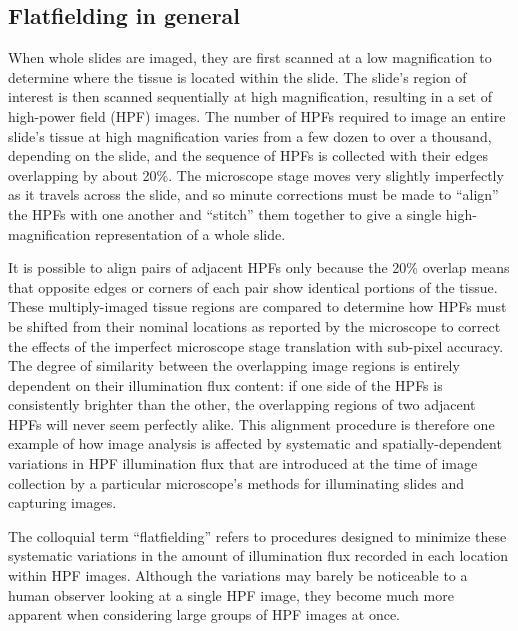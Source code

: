 \documentclass[letterpaper,11pt]{article}
\begin{document}
\subsection{Flatfielding in general}
\label{ssec:flatfielding_in_general}

When whole slides are imaged, they are first scanned at a low magnification to determine where the tissue is located within the slide. The slide's region of interest is then scanned sequentially at high magnification, resulting in a set of high-power field (HPF) images. The number of HPFs required to image an entire slide's tissue at high magnification varies from a few dozen to over a thousand, depending on the slide, and the sequence of HPFs is collected with their edges overlapping by about 20\%. The microscope stage moves very slightly imperfectly as it travels across the slide, and so minute corrections must be made to ``align'' the HPFs with one another and ``stitch'' them together to give a single high-magnification representation of a whole slide.

It is possible to align pairs of adjacent HPFs only because the 20\% overlap means that opposite edges or corners of each pair show identical portions of the tissue. These multiply-imaged tissue regions are compared to determine how HPFs must be shifted from their nominal locations as reported by the microscope to correct the effects of the imperfect microscope stage translation with sub-pixel accuracy\cite{Heshy}. The degree of similarity between the overlapping image regions is entirely dependent on their illumination flux content: if one side of the HPFs is consistently brighter than the other, the overlapping regions of two adjacent HPFs will never seem perfectly alike. This alignment procedure is therefore one example of how image analysis is affected by systematic and spatially-dependent variations in HPF illumination flux that are introduced at the time of image collection by a particular microscope's methods for illuminating slides and capturing images.

The colloquial term ``flatfielding'' refers to procedures designed to minimize these systematic variations in the amount of illumination flux recorded in each location within HPF images. Although the variations may barely be noticeable to a human observer looking at a single HPF image, they become much more apparent when considering large groups of HPF images at once.

\end{document}

